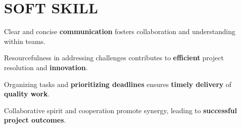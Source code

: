 \documentclass[]{deedy-resume-openfont}
\begin{document}
\begin{minipage}[t]{0.66\textwidth}
\section{SOFT SKILL}
\vspace{\topsep} %
\begin{tightemize}
\item Clear and concise \textbf{communication} fosters collaboration and understanding within teams.
\item  Resourcefulness in addressing challenges contributes to \textbf{efficient} project resolution and \textbf{innovation}.
\item  Organizing tasks and \textbf{prioritizing deadlines} ensures \textbf{timely delivery} of \textbf{quality work}.
\item  Collaborative spirit and cooperation promote synergy, leading to \textbf{successful project outcomes}.

\end{tightemize}




\end{minipage} 
\end{document}

